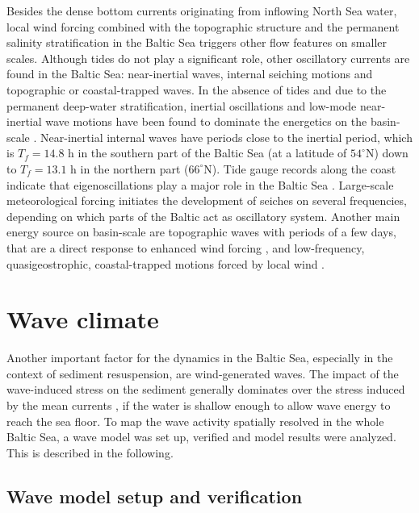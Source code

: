 Besides the dense bottom currents originating from inflowing North Sea water, 
local wind forcing combined with the topographic structure and the permanent 
salinity stratification in the Baltic Sea triggers other flow features on 
smaller scales. Although tides do not play a significant role, other 
oscillatory currents are found in the Baltic Sea: near-inertial waves, internal 
seiching motions and topographic or coastal-trapped waves.
In the absence of tides and due to the permanent deep-water stratification, 
inertial oscillations and low-mode near-inertial wave motions have been found to 
dominate the energetics on the basin-scale \citep[][]{vanderlee2011}. 
Near-inertial internal waves have periods close to the inertial period, which is 
$T_f = 14.8$ h in the southern part of the Baltic Sea (at a latitude of 
$54^{\circ}$N) down to $T_f = 13.1$ h in the northern part ($66^{\circ}$N). 
Tide gauge records along the coast indicate that eigenoscillations play a 
major role in the Baltic Sea \citep[][]{wubber1979}. Large-scale meteorological 
forcing initiates the development of seiches on several frequencies, depending 
on which parts of the Baltic act as oscillatory system. 
 Another main energy source on basin-scale are topographic waves with periods 
of a few days, that are a direct response to enhanced wind forcing 
\citep[][]{holtermann2012}, and low-frequency, quasigeostrophic, 
coastal-trapped motions forced by local wind \citep[][]{pizarro1998}.

\section{Wave climate}\label{balticswan}

Another important factor for the dynamics in the Baltic Sea, especially 
in the context of sediment resuspension, are wind-generated waves. The impact 
of the wave-induced stress on the sediment generally dominates over the stress 
induced by the mean currents \citep[][]{Grant1986}, if the water is shallow 
enough to allow wave energy to reach the sea floor. To map the wave activity 
spatially resolved in the whole Baltic Sea, a wave model was set up, verified 
and model results were analyzed. This is described in the following.

\subsection{Wave model setup and verification}

